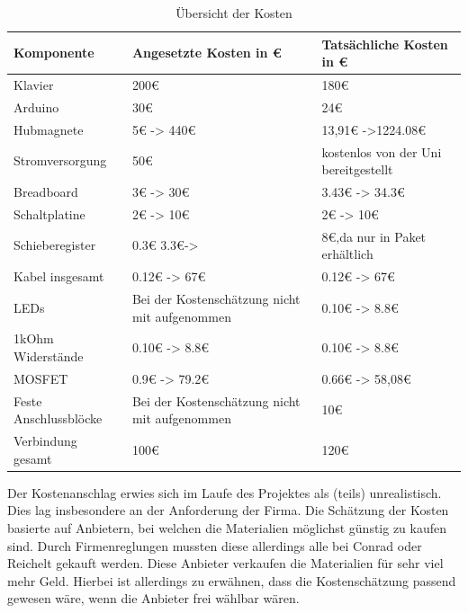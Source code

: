 \begin{table}[htbp]
    \centering
    \begin{tabular}{|m{3.8cm}|m{5cm}|m{5cm}|}
        \hline
        \textbf{Komponente} &  \textbf{Angesetzte Kosten in \euro{}} & \textbf{Tatsächliche Kosten in \euro{}}  \\
        \hline
        Klavier & 200\euro{} & 180\euro{} \\
        \hline
        Arduino & 30\euro{} & 24\euro{} \\
        \hline
        Hubmagnete & 5\euro{} -> 440\euro{} & 13,91\euro{} ->1224.08\euro{} \\
        \hline
        Stromversorgung & 50\euro{} & kostenlos von der Uni bereitgestellt \\
        \hline
        Breadboard & 3\euro{} -> 30\euro{} & 3.43\euro{} -> 34.3\euro{} \\
        \hline
        Schaltplatine & 2\euro{} -> 10\euro{} & 2\euro{} -> 10\euro{}\\
        \hline
        Schieberegister & 0.3\euro{} 3.3\euro{}->  & 8\euro{},da nur in Paket erhältlich\\
        \hline
        Kabel insgesamt & 0.12\euro{}  -> 67\euro{} & 0.12\euro{}  -> 67\euro{}\\
        \hline
        LEDs & Bei der Kostenschätzung nicht mit aufgenommen & 0.10\euro{} -> 8.8\euro{} \\
        \hline
        1kOhm Widerstände & 0.10\euro{} -> 8.8\euro{} & 0.10\euro{} -> 8.8\euro{} \\
        \hline
        MOSFET & 0.9\euro{} -> 79.2\euro{} & 0.66\euro{} -> 58,08\euro{} \\
        \hline
        Feste Anschlussblöcke & Bei der Kostenschätzung nicht mit aufgenommen  & 10\euro{}\\
        \hline
        Verbindung gesamt & 100\euro{} & 120\euro{} \\
        \hline
    \end{tabular}
    \caption{Übersicht der Kosten}
    \label{table:kosten}
\end{table}

Der Kostenanschlag erwies sich im Laufe des Projektes als (teils) unrealistisch. Dies lag insbesondere an der Anforderung
der Firma. Die Schätzung der Kosten basierte auf Anbietern, bei welchen die Materialien möglichst günstig zu kaufen sind.
Durch Firmenreglungen mussten diese allerdings alle bei Conrad oder Reichelt
gekauft werden. Diese Anbieter verkaufen die Materialien für sehr viel mehr Geld.
Hierbei ist allerdings zu erwähnen, dass die Kostenschätzung passend gewesen wäre, wenn die Anbieter frei wählbar wären.

